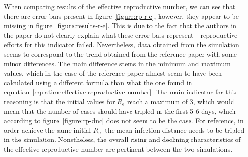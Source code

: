 \documentclass[a4paper]{article}
\begin{document}
\par
When comparing results of the effective reproductive number, we can see that there are error bars present in figure~\ref{figure:rp-r-e}, however, they appear to be missing in figure~\ref{figure:results-r-e}. This is due to the fact that the authors in the paper do not clearly explain what these error bars represent - reproductive efforts for this indicator failed. Nevertheless, data obtained from the simulation seems to correspond to the trend obtained from the reference paper \cite{Maltezos2021} with some minor differences. The main difference stems in the minimum and maximum values, which in the case of the reference paper \cite{Maltezos2021} almost seem to have been calculated using a different formula than what the one found in equation~\eqref{equation:effective-reproductive-number}. The main indicator for this reasoning is that the initial values for $R_\textrm{e}$ reach a maximum of 3, which would mean that the number of cases should have tripled in the first 5-6 days, which according to figure~\ref{figure:rp-dnc} does not seem to be the case. For reference, in order achieve the same initial $R_\textrm{e}$, the mean infection distance needs to be tripled in the simulation. Nonetheless, the overall rising and declining characteristics of the effective reproductive number are pertinent between the two simulations.
\end{document}
